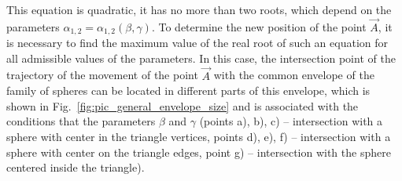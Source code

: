 \documentclass[
11pt,%
tightenlines,%
twoside,%
onecolumn,%
nofloats,%
nobibnotes,%
nofootinbib,%
superscriptaddress,%
noshowpacs,%
centertags]%
{revtex4-2}
\begin{document}
This equation is quadratic, it has no more than two roots, which depend on the parameters $\alpha_{1,2} = \alpha_{1,2}(\beta, \gamma)$.
To determine the new position of the point $\vec{A}$, it is necessary to find the maximum value of the real root of such an equation for all admissible values of the parameters.
In this case, the intersection point of the trajectory of the
movement of the point  $\vec{A}$ with the common envelope of the
family of spheres can be located in different parts of this
envelope, which is shown in Fig.~\ref{fig:pic_general_envelope_size}
and is associated with the conditions that the parameters $\beta$
and $\gamma$ (points a), b), c) -- intersection with a sphere with
center in the triangle vertices, points d), e), f) -- intersection
with a sphere with center on the triangle edges, point g) --
intersection with the sphere centered inside the triangle).
\end{document}
